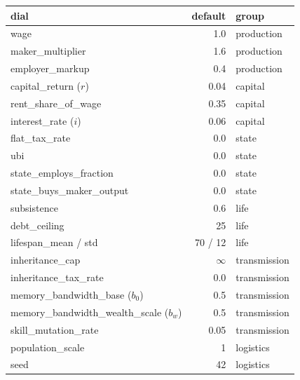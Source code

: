 \documentclass[11pt]{article}
\begin{document}
\begin{table}[h]
\centering
\small
\begin{tabular}{lrl}
\toprule
dial & default & group \\
\midrule
wage                          & 1.0 & production \\
maker\_multiplier             & 1.6 & production \\
employer\_markup              & 0.4 & production \\
capital\_return ($r$)         & 0.04 & capital \\
rent\_share\_of\_wage         & 0.35 & capital \\
interest\_rate ($i$)          & 0.06 & capital \\
flat\_tax\_rate               & 0.0  & state \\
ubi                           & 0.0  & state \\
state\_employs\_fraction      & 0.0  & state \\
state\_buys\_maker\_output    & 0.0  & state \\
subsistence                   & 0.6  & life \\
debt\_ceiling                 & 25   & life \\
lifespan\_mean / std          & 70 / 12 & life \\
inheritance\_cap              & $\infty$ & transmission \\
inheritance\_tax\_rate        & 0.0   & transmission \\
memory\_bandwidth\_base ($b_0$) & 0.5 & transmission \\
memory\_bandwidth\_wealth\_scale ($b_w$) & 0.5 & transmission \\
skill\_mutation\_rate         & 0.05 & transmission \\
population\_scale             & 1    & logistics \\
seed                          & 42   & logistics \\
\bottomrule
\end{tabular}
\end{table}
\end{document}
